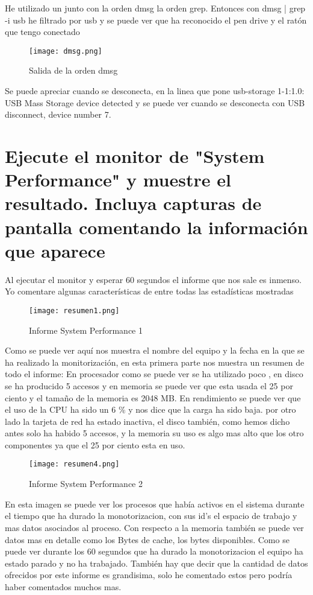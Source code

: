 He utilizado un junto con la orden dmsg la orden grep. Entonces con dmsg | grep -i usb he filtrado por usb y se puede ver que ha reconocido el pen drive y el ratón que tengo conectado
\begin{figure}[H] 
\centering
\texttt{[image: dmsg.png]}  
\label{figura6:}
\caption{Salida de la orden dmsg}
\end{figure}
Se puede apreciar cuando se desconecta, en la linea que pone usb-storage 1-1:1.0: USB Mass Storage device detected y se puede ver cuando se desconecta con USB disconnect, device number 7.
\section{Ejecute el monitor de "System Performance" y muestre el resultado. Incluya capturas de pantalla comentando la información que aparece}
Al ejecutar el monitor y esperar 60 segundos el informe que nos sale es inmenso. Yo comentare algunas características de entre todas las estadísticas mostradas
\begin{figure}[H] 
\centering
\texttt{[image: resumen1.png]}  
\label{figura7:}
\caption{Informe System Performance 1}
\end{figure}

Como se puede ver aquí nos muestra el nombre del equipo y la fecha en la que se ha realizado la monitorización, en esta primera parte nos muestra un resumen de todo el informe:
En procesador como se puede ver se ha utilizado poco , en disco se ha producido 5 accesos y en memoria se puede ver que esta usada el 25 por ciento y el tamaño de la memoria es 2048 MB.
En rendimiento se puede ver que el uso de la CPU ha sido un 6 \% y nos dice que la carga ha sido baja. por otro lado la tarjeta de red ha estado inactiva, el disco también, como hemos dicho antes solo ha habido 5 accesos, y la memoria su uso es algo mas alto que los otro componentes ya que el 25 por ciento esta en uso.

\begin{figure}[H] 
\centering
\texttt{[image: resumen4.png]}  
\label{figura8:}
\caption{Informe System Performance 2}
\end{figure}
En esta imagen se puede ver los procesos que había activos en el sistema durante el tiempo que ha durado la monotorizacion, con sus id's el espacio de trabajo y mas datos asociados al proceso.
Con respecto a la memoria también se puede ver datos mas en detalle como los Bytes de cache, los bytes disponibles.
Como se puede ver durante los 60 segundos que ha durado la monotorizacion el equipo ha estado parado y no ha trabajado. También hay que decir que la cantidad de datos ofrecidos por este informe es grandisima, solo he comentado estos pero podría haber comentados muchos mas.
